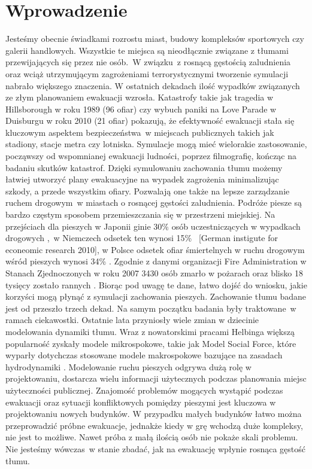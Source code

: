 \chapter{Wprowadzenie}
\label{cha:wprowadzenie}

Jesteśmy obecnie świadkami rozrostu miast, budowy kompleksów sportowych czy galerii handlowych. Wszystkie te miejsca są nieodłącznie związane z tłumami przewijających się przez nie osób.~W związku~z rosnącą gęstością zaludnienia oraz wciąż utrzymującym zagrożeniami terrorystycznymi \cite{terrorism} tworzenie symulacji nabrało większego znaczenia. W ostatnich dekadach ilość wypadków związanych ze złym planowaniem ewakuacji wzrosła. Katastrofy takie jak tragedia w Hillsborough w roku 1989 (96 ofiar) \cite{hillsborough} czy wybuch paniki na Love Parade w Duisburgu w roku 2010 (21 ofiar) \cite{lovedisaster} pokazują, że efektywność ewakuacji stała się kluczowym aspektem bezpieczeństwa~w miejscach publicznych takich jak stadiony, stacje metra czy lotniska. Symulacje mogą mieć wielorakie zastosowanie, począwszy od wspomnianej ewakuacji ludności, poprzez filmografię, kończąc na badaniu skutków katastrof. Dzięki symulowaniu zachowania tłumu możemy łatwiej utworzyć plany ewakuacyjne na wypadek zagrożenia minimalizując szkody, a przede wszystkim ofiary. Pozwalają one także na lepsze zarządzanie ruchem drogowym~w miastach o rosnącej gęstości zaludnienia.
Podróże piesze są bardzo częstym sposobem przemieszczania się w przestrzeni miejskiej. Na przejściach dla pieszych w Japonii ginie 30\% osób uczestniczących w wypadkach drogowych \cite{AMSFMfPBSaSC},~w Niemczech odsetek ten wynosi 15\% \ [German instigute for econeomic research 2010], w Polsce odsetek ofiar śmiertelnych w ruchu drogowym wśród pieszych wynosi 34\% \cite{metodologiaZachowan}. Zgodnie z danymi organizacji Fire Administration w Stanach Zjednoczonych w roku 2007 3430 osób zmarło w pożarach oraz blisko 18 tysięcy zostało rannych \cite{Asfemwle}. Biorąc pod uwagę te dane, łatwo dojść do wniosku, jakie korzyści mogą płynąć z symulacji zachowania pieszych.
Zachowanie tłumu badane jest od przeszło trzech dekad. Na samym początku badania były traktowane~w ramach ciekawostki. Ostatnie lata przyniosły wiele zmian w dziecinie modelowania dynamiki tłumu. Wraz z nowatorskimi pracami Helbinga \cite{SforceModelForPedDyn} większą popularność zyskały modele mikrospokowe, takie jak Model Social Force, które wyparły dotychczas stosowane modele makrospokowe bazujące na zasadach hydrodynamiki  \cite{SforceModelForPedDyn}. Modelowanie ruchu pieszych odgrywa dużą rolę w projektowaniu, dostarcza wielu informacji użytecznych podczas planowania miejsc użyteczności publicznej. Znajomość problemów mogących wystąpić podczas ewakuacji oraz sytuacji konfliktowych pomiędzy pieszymi jest kluczowa w projektowaniu nowych budynków. W przypadku małych budynków łatwo można przeprowadzić próbne ewakuacje, jednakże kiedy w grę wchodzą duże kompleksy, nie jest to możliwe. Nawet próba z małą ilością osób nie pokaże skali problemu. Nie jesteśmy wówczas~w stanie zbadać, jak na ewakuację wpłynie rosnąca gęstość tłumu.
